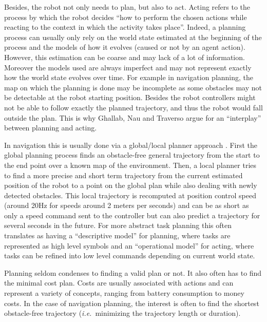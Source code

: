 \documentclass[a4paper,11pt,twoside]{StyleThese}
\begin{document}
Besides, the robot not only needs to plan, but also to act. Acting refers to the process by which the robot decides ``how to perform the chosen actions while reacting to the context in which the activity takes place''. Indeed, a planning process can usually only rely on the world state estimated at the beginning of the process and the models of how it evolves (caused or not by an agent action). However, this estimation can be coarse and may lack of a lot of information. Moreover the models used are always imperfect and may not represent exactly how the world state evolves over time. For example in navigation planning, the map on which the planning is done may be incomplete as some obstacles may not be detectable at the robot starting position. Besides the robot controllers might not be able to follow exactly the planned trajectory, and thus the robot would fall outside the plan. This is why Ghallab, Nau and Traverso argue for an ``interplay'' between planning and acting.

In navigation this is usually done via a global/local planner approach \cite{choset2005principles}. First the global planning process finds an obstacle-free general trajectory from the start to the end point over a known map of the environment. Then, a local planner tries to find a more precise and short term trajectory from the current estimated position of the robot to a point on the global plan while also dealing with newly detected obstacles. This local trajectory is recomputed at position control speed (around 20Hz for speeds around 2 meters per seconds) and can be as short as only a speed command sent to the controller but can also predict a trajectory for several seconds in the future. For more abstract task planning this often translates as having a ``descriptive model'' for planning, where tasks are represented as high level symbols and an ``operational model'' for acting, where tasks can be refined into low level commands depending on current world state.

Planning seldom condenses to finding a valid plan or not. It also often has to find the minimal cost plan. Costs are usually associated with actions and can represent a variety of concepts, ranging from battery consumption to money costs. In the case of navigation planning, the interest is often to find the shortest obstacle-free trajectory (\textit{i.e.}~minimizing the trajectory length or duration).
\end{document}

